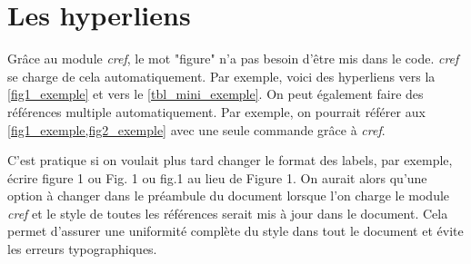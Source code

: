 \documentclass[../exemple_master.tex]{subfiles}
\begin{document}
\section{Les hyperliens}

Grâce au module \emph{cref}, le mot "figure" n'a pas besoin d'être mis dans le code. \emph{cref} se charge de cela automatiquement. Par exemple, voici des hyperliens vers la \cref{fig1_exemple} et vers le \cref{tbl_mini_exemple}. On peut également faire des références multiple automatiquement. Par exemple, on pourrait référer aux \cref{fig1_exemple,fig2_exemple} avec une seule commande grâce à \emph{cref}.

C'est pratique si on voulait plus tard changer le format des labels, par exemple, écrire figure 1 ou Fig. 1 ou fig.1 au lieu de Figure 1. On aurait alors qu'une option à changer dans le préambule du document lorsque l'on charge le module \emph{cref} et le style de toutes les références serait mis à jour dans le document. Cela permet d'assurer une uniformité complète du style dans tout le document et évite les erreurs typographiques.
\end{document}
